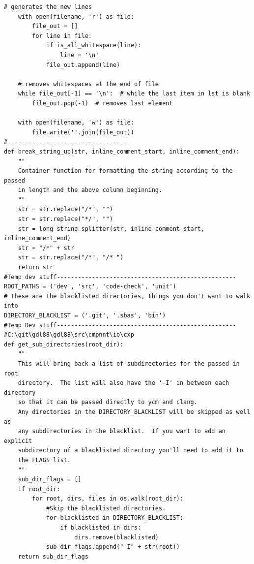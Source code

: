 \documentclass[11pt]{scrreprt}
\begin{document}
\begin{lstlisting}[frame=single,basicstyle=\small]
    # generates the new lines
    with open(filename, 'r') as file:
        file_out = []
        for line in file:
            if is_all_whitespace(line):
                line = '\n'
            file_out.append(line)

    # removes whitespaces at the end of file
    while file_out[-1] == '\n':  # while the last item in lst is blank
        file_out.pop(-1)  # removes last element

    with open(filename, 'w') as file:
        file.write(''.join(file_out))
#----------------------------------
def break_string_up(str, inline_comment_start, inline_comment_end):
    ""
    Container function for formatting the string according to the passed
    in length and the above column beginning.
    ""
    str = str.replace("/*", "")
    str = str.replace("*/", "")
    str = long_string_splitter(str, inline_comment_start, inline_comment_end)
    str = "/*" + str
    str = str.replace("/*", "/* ")
    return str
#Temp dev stuff---------------------------------------------------
ROOT_PATHS = ('dev', 'src', 'code-check', 'unit')
# These are the blacklisted directories, things you don't want to walk into
DIRECTORY_BLACKLIST = ('.git', '.sbas', 'bin')
#Temp Dev stuff---------------------------------------------------
#C:\git\gdl88\gdl88\src\cmpnnt\io\cxp
def get_sub_directories(root_dir):
    ""
    This will bring back a list of subdirectories for the passed in root
    directory.  The list will also have the '-I' in between each directory
    so that it can be passed directly to ycm and clang.
    Any directories in the DIRECTORY_BLACKLIST will be skipped as well as
    any subdirectories in the blacklist.  If you want to add an explicit
    subdirectory of a blacklisted directory you'll need to add it to
    the FLAGS list.
    ""
    sub_dir_flags = []
    if root_dir:
        for root, dirs, files in os.walk(root_dir):
            #Skip the blacklisted directories.
            for blacklisted in DIRECTORY_BLACKLIST:
                if blacklisted in dirs:
                    dirs.remove(blacklisted)
            sub_dir_flags.append("-I" + str(root))
    return sub_dir_flags


\end{lstlisting}
\end{document}
